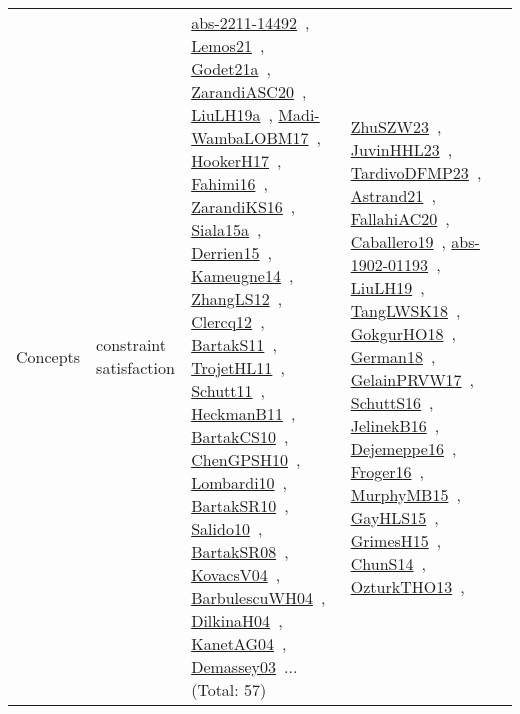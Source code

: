 {\begin{longtable}{lp{3cm}>{\raggedright\arraybackslash}p{6cm}>{\raggedright\arraybackslash}p{6cm}>{\raggedright\arraybackslash}p{8cm}}
\index{constraint satisfaction}\index{Concepts!constraint satisfaction}Concepts & constraint satisfaction & \href{../works/abs-2211-14492.pdf}{abs-2211-14492}~\cite{abs-2211-14492}, \href{../works/Lemos21.pdf}{Lemos21}~\cite{Lemos21}, \href{../works/Godet21a.pdf}{Godet21a}~\cite{Godet21a}, \href{../works/ZarandiASC20.pdf}{ZarandiASC20}~\cite{ZarandiASC20}, \href{../works/LiuLH19a.pdf}{LiuLH19a}~\cite{LiuLH19a}, \href{../works/Madi-WambaLOBM17.pdf}{Madi-WambaLOBM17}~\cite{Madi-WambaLOBM17}, \href{../works/HookerH17.pdf}{HookerH17}~\cite{HookerH17}, \href{../works/Fahimi16.pdf}{Fahimi16}~\cite{Fahimi16}, \href{../works/ZarandiKS16.pdf}{ZarandiKS16}~\cite{ZarandiKS16}, \href{../works/Siala15a.pdf}{Siala15a}~\cite{Siala15a}, \href{../works/Derrien15.pdf}{Derrien15}~\cite{Derrien15}, \href{../works/Kameugne14.pdf}{Kameugne14}~\cite{Kameugne14}, \href{../works/ZhangLS12.pdf}{ZhangLS12}~\cite{ZhangLS12}, \href{../works/Clercq12.pdf}{Clercq12}~\cite{Clercq12}, \href{../works/BartakS11.pdf}{BartakS11}~\cite{BartakS11}, \href{../works/TrojetHL11.pdf}{TrojetHL11}~\cite{TrojetHL11}, \href{../works/Schutt11.pdf}{Schutt11}~\cite{Schutt11}, \href{../works/HeckmanB11.pdf}{HeckmanB11}~\cite{HeckmanB11}, \href{../works/BartakCS10.pdf}{BartakCS10}~\cite{BartakCS10}, \href{../works/ChenGPSH10.pdf}{ChenGPSH10}~\cite{ChenGPSH10}, \href{../works/Lombardi10.pdf}{Lombardi10}~\cite{Lombardi10}, \href{../works/BartakSR10.pdf}{BartakSR10}~\cite{BartakSR10}, \href{../works/Salido10.pdf}{Salido10}~\cite{Salido10}, \href{../works/BartakSR08.pdf}{BartakSR08}~\cite{BartakSR08}, \href{../works/KovacsV04.pdf}{KovacsV04}~\cite{KovacsV04}, \href{../works/BarbulescuWH04.pdf}{BarbulescuWH04}~\cite{BarbulescuWH04}, \href{../works/DilkinaH04.pdf}{DilkinaH04}~\cite{DilkinaH04}, \href{../works/KanetAG04.pdf}{KanetAG04}~\cite{KanetAG04}, \href{../works/Demassey03.pdf}{Demassey03}~\cite{Demassey03}... (Total: 57) & \href{../works/ZhuSZW23.pdf}{ZhuSZW23}~\cite{ZhuSZW23}, \href{../works/JuvinHHL23.pdf}{JuvinHHL23}~\cite{JuvinHHL23}, \href{../works/TardivoDFMP23.pdf}{TardivoDFMP23}~\cite{TardivoDFMP23}, \href{../works/Astrand21.pdf}{Astrand21}~\cite{Astrand21}, \href{../works/FallahiAC20.pdf}{FallahiAC20}~\cite{FallahiAC20}, \href{../works/Caballero19.pdf}{Caballero19}~\cite{Caballero19}, \href{../works/abs-1902-01193.pdf}{abs-1902-01193}~\cite{abs-1902-01193}, \href{../works/LiuLH19.pdf}{LiuLH19}~\cite{LiuLH19}, \href{../works/TangLWSK18.pdf}{TangLWSK18}~\cite{TangLWSK18}, \href{../works/GokgurHO18.pdf}{GokgurHO18}~\cite{GokgurHO18}, \href{../works/German18.pdf}{German18}~\cite{German18}, \href{../works/GelainPRVW17.pdf}{GelainPRVW17}~\cite{GelainPRVW17}, \href{../works/SchuttS16.pdf}{SchuttS16}~\cite{SchuttS16}, \href{../works/JelinekB16.pdf}{JelinekB16}~\cite{JelinekB16}, \href{../works/Dejemeppe16.pdf}{Dejemeppe16}~\cite{Dejemeppe16}, \href{../works/Froger16.pdf}{Froger16}~\cite{Froger16}, \href{../works/MurphyMB15.pdf}{MurphyMB15}~\cite{MurphyMB15}, \href{../works/GayHLS15.pdf}{GayHLS15}~\cite{GayHLS15}, \href{../works/GrimesH15.pdf}{GrimesH15}~\cite{GrimesH15}, \href{../works/ChunS14.pdf}{ChunS14}~\cite{ChunS14}, \href{../works/OzturkTHO13.pdf}{OzturkTHO13}~\cite{OzturkTHO13}, 
\end{longtable}}
